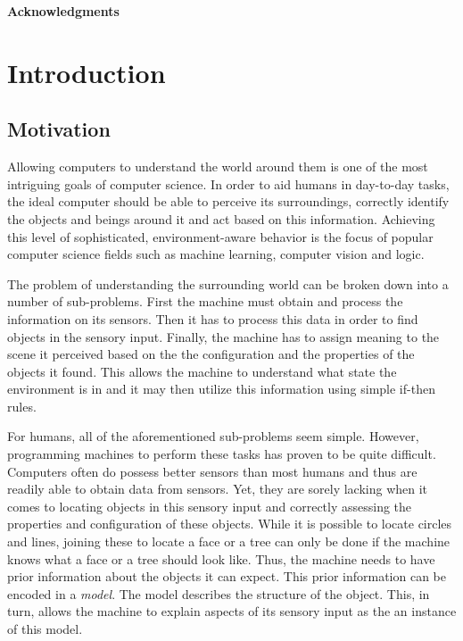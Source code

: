 \documentclass[11pt,a4paper,twoside]{report}
\begin{document}
\begin{center}
\LARGE \textbf{Acknowledgments}
\end{center}



\tableofcontents

\chapter{Introduction}
\section{Motivation}
Allowing computers to understand the world around them is one of the most
intriguing goals of computer science. In order to aid humans in day-to-day
tasks, the ideal computer should be able to perceive its surroundings, correctly identify the objects and beings around it and act based
on this information. Achieving this level of sophisticated, environment-aware
behavior is the focus of popular computer science fields such as machine
learning, computer vision and logic.

The problem of understanding the surrounding world can be broken down into a
number of sub-problems. First the machine must obtain and process the information on
its sensors. Then it has to process this data in order to find objects in the
sensory input. Finally, the machine has to assign meaning to the scene it perceived
based on the the configuration and the properties of the objects it found. This
allows the machine to understand what state the environment is in and it may
then utilize this information using simple if-then rules.

For humans, all of the aforementioned sub-problems seem simple. However, programming
machines to perform these tasks has proven to be quite difficult. Computers often do
possess better sensors than most humans and thus are readily able to obtain data
from sensors. Yet, they are sorely lacking when it comes to locating objects
in this sensory input and correctly assessing the properties and configuration
of these objects. While it is possible to locate circles and lines, joining
these to locate a face or a tree can only be done if the machine knows what a
face or a tree should look like. Thus, the machine needs to have prior
information about the objects it can expect. This prior information can be
encoded in a \textit{model}. The model describes the structure of the object.
This, in turn, allows the machine to explain aspects of its sensory input as the
an instance of this model.
\end{document}

